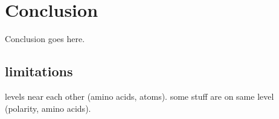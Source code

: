 \documentclass[review,journal]{vgtc}         %
\begin{document}
%
%


\section{Conclusion}

Conclusion goes here.

\subsection{limitations}
levels near each other (amino acids, atoms).
some stuff are on same level (polarity, amino acids).





\end{document}
